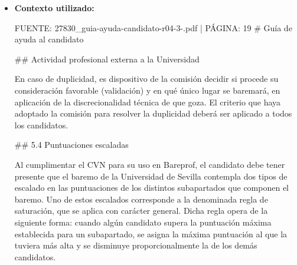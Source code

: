 \documentclass{article}
\begin{document}
\begin{itemize}
\begin{itemize}
                Por ejemplo, si un candidato ha impartido 1500 horas de docencia en asignaturas regladas universitarias, con afinidad muy alta, y 300 horas de docencia en Máster Universitario, la puntuación se calcularía de la siguiente manera:

                * Puntuación por hora de docencia: 1,00 x 10 horas de docencia = 10 puntos por hora
                * Puntuación total por 1200 horas de docencia: 1200 horas x 10 puntos/hora = 12000 puntos
                * Puntuación total por 300 horas de docencia en Máster Universitario: 300 horas x 10 puntos/hora x 1,50 (complemento 1) = 4500 puntos
                * Puntuación total: 12000 puntos + 4500 puntos = 16500 puntos
                * Factor de escala: 1200 horas / 1500 horas = 0,8
                * Puntuación final: 16500 puntos x 0,8 = 13200 puntos

                Sin embargo, como la puntuación máxima para este apartado es de 50 puntos, la puntuación final se ajustaría a 50 puntos.

                Es importante tener en cuenta que la comisión de contratación puede aplicar la regla de saturación si algún candidato supera la puntuación máxima establecida para un subapartado. En ese caso, se asignaría la máxima puntuación al candidato con la puntuación más alta y se disminuiría proporcionalmente la puntuación de los demás candidatos.
          \item \textbf{Contexto utilizado:}
                \begin{scriptsize}
                  FUENTE: 27830\_guia-ayuda-candidato-r04-3-.pdf | PÁGINA: 19
                  \# Guía de ayuda al candidato

                  \#\# Actividad profesional externa a la Universidad

                  En caso de duplicidad, es dispositivo de la comisión decidir si procede su consideración favorable (validación) y en qué único lugar se baremará, en aplicación de la discrecionalidad técnica de que goza. El criterio que haya adoptado la comisión para resolver la duplicidad deberá ser aplicado a todos los candidatos.

                  \#\# 5.4 Puntuaciones escaladas

                  Al cumplimentar el CVN para su uso en Bareprof, el candidato debe tener presente que el baremo de la Universidad de Sevilla contempla dos tipos de escalado en las puntuaciones de los distintos subapartados que componen el baremo. Uno de estos escalados corresponde a la denominada regla de saturación, que se aplica con carácter general. Dicha regla opera de la siguiente forma: cuando algún candidato supera la puntuación máxima establecida para un subapartado, se asigna la máxima puntuación al que la tuviera más alta y se disminuye proporcionalmente la de los demás candidatos.


\end{scriptsize}
\end{itemize}
\end{itemize}
\end{document}
